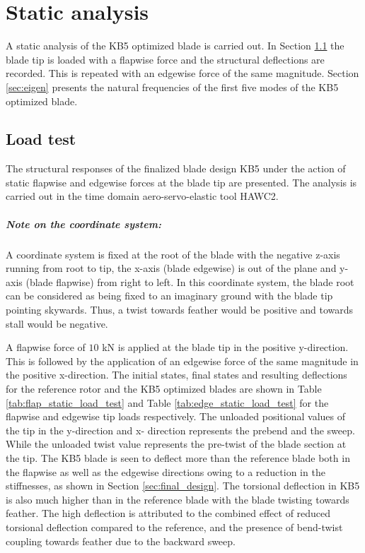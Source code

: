 \chapter{Static analysis}
\label{ch:load_test}
A static analysis of the KB5 optimized blade is carried out. In Section \ref{sec:load_test} the blade tip is loaded with a flapwise force and the structural deflections are recorded. This is repeated with an edgewise force of the same magnitude. Section \ref{sec:eigen} presents the natural frequencies of the first five modes of the KB5 optimized blade. 
\section{Load test}
\label{sec:load_test}
The structural responses of the finalized blade design KB5 under the action of static flapwise and edgewise forces at the blade tip are presented. The analysis is carried out in the time domain aero-servo-elastic tool HAWC2. 
\paragraph{Note on the coordinate system:}
A coordinate system is fixed at the root of the blade with the negative z-axis running from root to tip, the x-axis (blade edgewise) is out of the plane and y-axis (blade flapwise) from right to left. In this coordinate system, the blade root can be considered as being fixed to an imaginary ground with the blade tip pointing skywards. Thus, a twist towards feather would be positive and towards stall would be negative.

A flapwise force of $10$ kN is applied at the blade tip in the positive y-direction. This is followed by the application of an edgewise force of the same magnitude in the positive x-direction. The initial states, final states and resulting deflections for the reference rotor and the KB5 optimized blades are shown in Table \ref{tab:flap_static_load_test} and Table \ref{tab:edge_static_load_test} for the flapwise and edgewise tip loads respectively. The unloaded positional values of the tip in the y-direction and x- direction represents the prebend and the sweep. While the unloaded twist value represents the pre-twist of the blade section at the tip. The KB5 blade is seen to deflect more than the reference blade both in the flapwise as well as the edgewise directions owing to a reduction in the stiffnesses, as shown in Section \ref{sec:final_design}. The torsional deflection in KB5 is also much higher than in the reference blade with the blade twisting towards feather. The high deflection is attributed to the combined effect of reduced torsional deflection compared to the reference, and the presence of bend-twist coupling towards feather due to the backward sweep.

